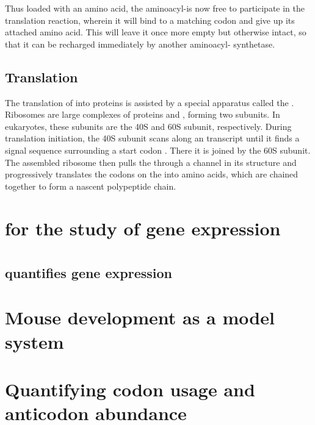 Thus loaded with an amino acid, the aminoacyl-\trna is now free to participate
in the translation reaction, wherein it will bind to a matching codon and give
up its attached amino acid. This will leave it once more empty but otherwise
intact, so that it can be recharged immediately by another aminoacyl-\trna
synthetase.

\subsection{Translation}

The translation of \mrna into proteins is assisted by a special apparatus called
the . Ribosomes are large complexes of proteins and \rrna,
forming two subunits. In eukaryotes, these subunits are the 40S and 60S subunit,
respectively. During translation initiation, the 40S subunit scans along an
\mrna transcript until it finds a signal sequence surrounding a start codon
\citep{Kozak:2002}. There it is joined by the 60S subunit. The assembled
ribosome then pulls the \mrna through a channel in its structure and
progressively translates the codons on the \mrna into amino acids, which are
chained together to form a nascent polypeptide chain.

\section{ for the study of gene expression}

\section{}

\subsection{ quantifies  gene expression}

\section{Mouse development as a model system}

\section{Quantifying codon usage and anticodon abundance}


